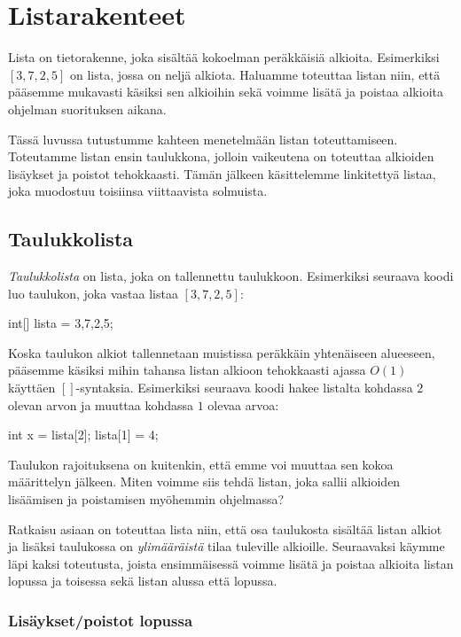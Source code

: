\chapter{Listarakenteet}

Lista on tietorakenne, joka sisältää kokoelman
peräkkäisiä alkioita.
Esimerkiksi $[3,7,2,5]$ on lista, jossa on neljä alkiota.
Haluamme toteuttaa listan niin, että pääsemme mukavasti
käsiksi sen alkioihin sekä voimme
lisätä ja poistaa alkioita ohjelman suorituksen aikana.

Tässä luvussa tutustumme kahteen menetelmään listan toteuttamiseen.
Toteutamme listan ensin taulukkona, jolloin vaikeutena on
toteuttaa alkioiden lisäykset ja poistot tehokkaasti.
Tämän jälkeen käsittelemme linkitettyä listaa,
joka muodostuu toisiinsa viittaavista solmuista.

\section{Taulukkolista}

\emph{Taulukkolista} on lista, joka on tallennettu taulukkoon.
Esimerkiksi seuraava koodi luo taulukon,
joka vastaa listaa $[3,7,2,5]$:

\begin{code}
int[] lista = {3,7,2,5};
\end{code}

Koska taulukon alkiot tallennetaan muistissa peräkkäin
yhtenäiseen alueeseen, pääsemme käsiksi mihin tahansa
listan alkioon tehokkaasti ajassa $O(1)$ käyttäen $[]$-syntaksia.
Esimerkiksi seuraava koodi hakee listalta kohdassa $2$
olevan arvon ja muuttaa kohdassa $1$ olevaa arvoa:

\begin{code}
int x = lista[2];
lista[1] = 4;
\end{code}

Taulukon rajoituksena on kuitenkin,
että emme voi muuttaa sen kokoa määrittelyn jälkeen.
Miten voimme siis tehdä listan, joka sallii alkioiden
lisäämisen ja poistamisen myöhemmin ohjelmassa?

Ratkaisu asiaan on toteuttaa lista niin,
että osa taulukosta sisältää listan alkiot
ja lisäksi taulukossa on \emph{ylimääräistä}
tilaa tuleville alkioille.
Seuraavaksi käymme läpi kaksi toteutusta,
joista ensimmäisessä voimme lisätä ja poistaa alkioita
listan lopussa ja toisessa sekä listan alussa että lopussa.

\subsection{Lisäykset/poistot lopussa}

